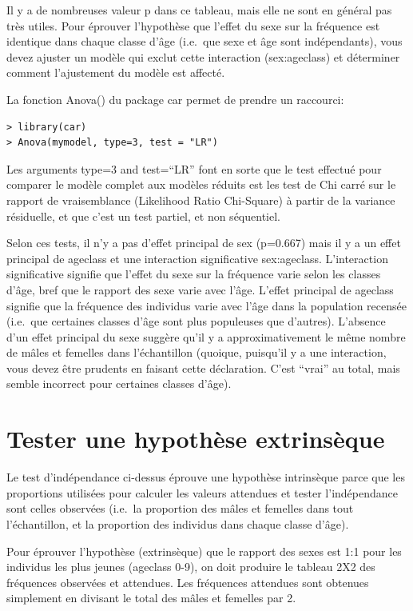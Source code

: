 \documentclass[12pt,]{book}
\begin{document}
Il y a de nombreuses valeur p dans ce tableau, mais elle ne sont en
général pas très utiles. Pour éprouver l'hypothèse que l'effet du sexe
sur la fréquence est identique dans chaque classe d'âge (i.e.~que sexe et
âge sont indépendants), vous devez ajuster un modèle qui exclut cette
interaction (sex:ageclass) et déterminer comment l'ajustement du
modèle est affecté.

La fonction Anova() du package car permet de prendre un raccourci:

\begin{verbatim}
> library(car)
> Anova(mymodel, type=3, test = "LR")
\end{verbatim}

Les arguments type=3 and test=``LR'' font en sorte que le test
effectué pour comparer le modèle complet aux modèles réduits est les
test de Chi carré sur le rapport de vraisemblance (Likelihood Ratio
Chi-Square) à partir de la variance résiduelle, et que c'est un test
partiel, et non séquentiel.

Selon ces tests, il n'y a pas d'effet principal de sex (p=0.667) mais il y a
un effet principal de ageclass et une interaction significative
sex:ageclass. L'interaction significative signifie que l'effet du sexe sur
la fréquence varie selon les classes d'âge, bref que le rapport des sexe
varie avec l'âge. L'effet principal de ageclass signifie que la fréquence
des individus varie avec l'âge dans la population recensée (i.e.~que
certaines classes d'âge sont plus populeuses que d'autres). L'absence
d'un effet principal du sexe suggère qu'il y a approximativement le
même nombre de mâles et femelles dans l'échantillon (quoique,
puisqu'il y a une interaction, vous devez être prudents en faisant cette
déclaration. C'est ``vrai'' au total, mais semble incorrect pour certaines
classes d'âge).

\hypertarget{tester-une-hypothuxe8se-extrinsuxe8que}{%
\section{Tester une hypothèse extrinsèque}\label{tester-une-hypothuxe8se-extrinsuxe8que}}

Le test d'indépendance ci-dessus éprouve une hypothèse intrinsèque
parce que les proportions utilisées pour calculer les valeurs attendues
et tester l'indépendance sont celles observées (i.e.~la proportion des
mâles et femelles dans tout l'échantillon, et la proportion des individus
dans chaque classe d'âge).

Pour éprouver l'hypothèse (extrinsèque) que le rapport des sexes est
1:1 pour les individus les plus jeunes (ageclass 0-9), on doit produire le
tableau 2X2 des fréquences observées et attendues. Les fréquences
attendues sont obtenues simplement en divisant le total des mâles et
femelles par 2.
\end{document}
